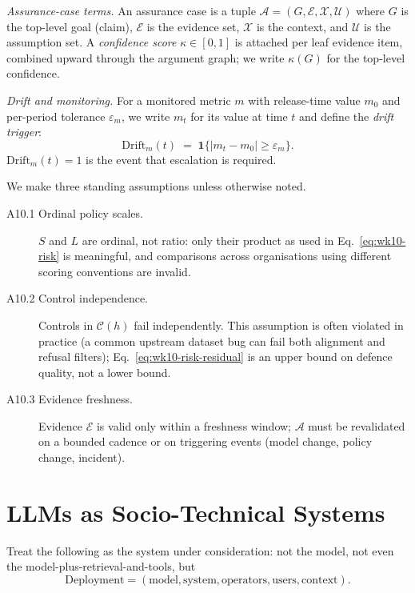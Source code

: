 \begin{notationbox}
\textit{Assurance-case terms.} An assurance case is a tuple
$\mathcal{A} = (G, \mathcal{E}, \mathcal{X}, \mathcal{U})$ where $G$ is the top-level goal
(claim), $\mathcal{E}$ is the evidence set, $\mathcal{X}$ is the context, and
$\mathcal{U}$ is the assumption set. A \emph{confidence score}
$\kappa \in [0, 1]$ is attached per leaf evidence item, combined
upward through the argument graph; we write $\kappa(G)$ for the
top-level confidence.

\textit{Drift and monitoring.} For a monitored metric $m$ with
release-time value $m_0$ and per-period tolerance $\varepsilon_m$,
we write $m_t$ for its value at time $t$ and define the
\emph{drift trigger}:
\begin{equation}
  \mathrm{Drift}_m(t) \;=\;
    \mathbf{1}\!\bigl\{ |m_t - m_0| \ge \varepsilon_m \bigr\}.
  \label{eq:wk10-drift}
\end{equation}
$\mathrm{Drift}_m(t) = 1$ is the event that escalation is
required.

We make three standing assumptions unless otherwise noted.
\begin{description}
  \item[A10.1 Ordinal policy scales.] $S$ and $L$ are ordinal,
    not ratio: only their product as used in
    Eq.~\eqref{eq:wk10-risk} is meaningful, and comparisons across
    organisations using different scoring conventions are invalid.
  \item[A10.2 Control independence.] Controls in $\mathcal{C}(h)$ fail
    independently. This assumption is often violated in practice
    (a common upstream dataset bug can fail both alignment and
    refusal filters); Eq.~\eqref{eq:wk10-risk-residual} is an
    upper bound on defence quality, not a lower bound.
  \item[A10.3 Evidence freshness.] Evidence $\mathcal{E}$ is valid only
    within a freshness window; $\mathcal{A}$ must be revalidated on a
    bounded cadence or on triggering events (model change, policy
    change, incident).
\end{description}
\end{notationbox}

\section{LLMs as Socio-Technical Systems}

Treat the following as the system under consideration: not the
model, not even the model-plus-retrieval-and-tools, but
$$ \text{Deployment} = (\text{model}, \text{system}, \text{operators}, \text{users}, \text{context}). $$

